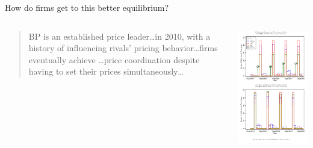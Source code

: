 \documentclass[dvipsnames]{beamer}
\begin{document}
  \begin{frame}{How do firms get to this better equilibrium?}
\begin{columns}
\begin{column}{0.7\textwidth}
    \begin{quote}
      BP is an established price leader\ldots in 2010, with a history of influencing rivals' pricing behavior\ldots firms eventually achieve \ldots price coordination despite having to set their prices simultaneously\ldots
    \end{quote}
\end{column}
\begin{column}{0.5\textwidth}  %

      \includegraphics[height=.9\textheight, keepaspectratio=true]{fig5.png}
\end{column}
\end{columns}
  \end{frame}
\end{document}
